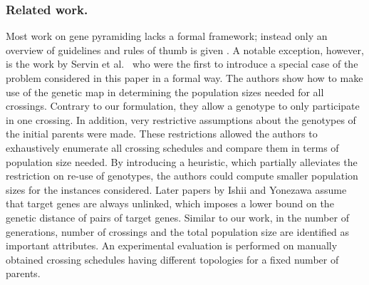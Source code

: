 \documentclass[runningheads]{llncs}
\begin{document}
%

\subsubsection{Related work.}
\label{sec:prev_work}
Most work on gene pyramiding lacks a formal framework; instead only an overview of guidelines and rules of thumb is given \cite{Ye:2008,Ishii-I:2007,Ishii-II:2007}. A notable exception, however, is the work by Servin et al.\ \cite{Servin:2004} who were the first to introduce a special case of the problem considered in this paper in a formal way. The authors show how to make use of the genetic map in determining the population sizes needed for all crossings. Contrary to our formulation, they allow a genotype to only participate in one crossing. In addition, very restrictive assumptions about the genotypes of the initial parents were made. These restrictions allowed the authors to exhaustively enumerate all crossing schedules and compare them in terms of population size needed. By introducing a heuristic, which partially alleviates the restriction on re-use of genotypes, the authors could compute smaller population sizes for the instances considered.
Later papers by Ishii and Yonezawa \cite{Ishii-I:2007,Ishii-II:2007} assume that target genes are always unlinked, which imposes a lower bound on the genetic distance of pairs of target genes. Similar to our work, in \cite{Ishii-I:2007,Ishii-II:2007} the number of generations, number of crossings and the total population size are identified as important attributes. An experimental evaluation is performed on manually obtained crossing schedules having different topologies for a fixed number of parents.
\end{document}
